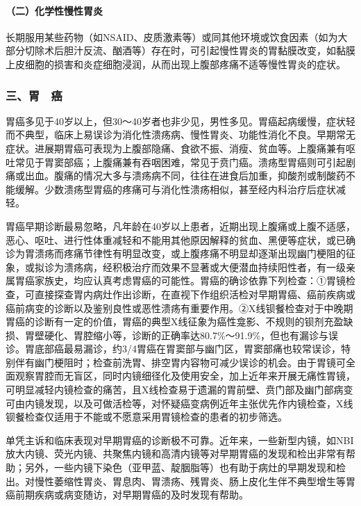 \paragraph{（二）化学性慢性胃炎}

长期服用某些药物（如NSAID、皮质激素等）或同其他环境或饮食因素（如为大部分切除术后胆汁反流、酗酒等）存在时，可引起慢性胃炎的胃黏膜改变，如黏膜上皮细胞的损害和炎症细胞浸润，从而出现上腹部疼痛不适等慢性胃炎的症状。

\subsubsection{三、胃　癌}

胃癌多见于40岁以上，但30～40岁者也非少见，男性多见。胃癌起病缓慢，症状轻而不典型，临床上易误诊为消化性溃疡病、慢性胃炎、功能性消化不良。早期常无症状。进展期胃癌可表现为上腹部隐痛、食欲不振、消瘦、贫血等。上腹痛兼有呕吐常见于胃窦部癌；上腹痛兼有吞咽困难，常见于贲门癌。溃疡型胃癌则可引起剧痛或出血。腹痛的情况大多与溃疡病不同，往往在进食后加重，抑酸剂或制酸药不能缓解。少数溃疡型胃癌的疼痛可与消化性溃疡相似，甚至经内科治疗后症状减轻。

胃癌早期诊断最易忽略，凡年龄在40岁以上患者，近期出现上腹痛或上腹不适感，恶心、呕吐、进行性体重减轻和不能用其他原因解释的贫血、黑便等症状，或已确诊为胃溃疡而疼痛节律性有明显改变，或上腹疼痛不明显却逐渐出现幽门梗阻的征象，或拟诊为溃疡病，经积极治疗而效果不显著或大便潜血持续阳性者，有一级亲属胃癌家族史，均应认真考虑胃癌的可能性。胃癌的确诊依靠下列检查：①胃镜检查，可直接探查胃内病灶作出诊断，在直视下作组织活检对早期胃癌、癌前疾病或癌前病变的诊断以及鉴别良性或恶性溃疡有重要作用。②X线钡餐检查对于中晚期胃癌的诊断有一定的价值，胃癌的典型X线征象为癌性龛影、不规则的钡剂充盈缺损、胃壁硬化、胃腔缩小等，诊断的正确率达80.7\%～91.9\%，但也有漏诊与误诊。胃底部癌最易漏诊，约3/4胃癌在胃窦部与幽门区，胃窦部痛也较常误诊，特别伴有幽门梗阻时；检查前洗胃、排空胃内容物可减少误诊的机会。由于胃镜可全面观察胃腔而无盲区，同时内镜细径化及使用安全，加上近年来开展无痛性胃镜，可明显减轻内镜检查的痛苦，且X线检查易于遗漏的胃前壁、贲门部及幽门部病变可由内镜发现，以及可做活检等，对怀疑癌变病例近年主张优先作内镜检查，X线钡餐检查仅适用于不能或不愿意采用胃镜检查的患者的初步筛选。

单凭主诉和临床表现对早期胃癌的诊断极不可靠。近年来，一些新型内镜，如NBI放大内镜、荧光内镜、共聚焦内镜和高清内镜等对早期胃癌的发现和检出非常有帮助；另外，一些内镜下染色（亚甲蓝、靛胭脂等）也有助于病灶的早期发现和检出。对慢性萎缩性胃炎、胃息肉、胃溃疡、残胃炎、肠上皮化生伴不典型增生等胃癌前期疾病或病变随访，对早期胃癌的及时发现有帮助。

